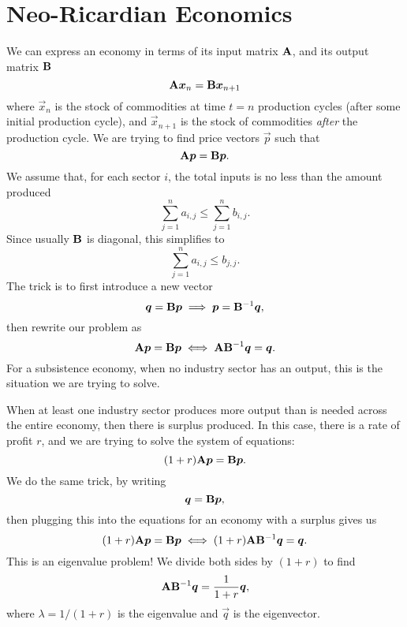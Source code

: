 \section{Neo-Ricardian Economics}

We can express an economy in terms of its input matrix $\mathbf{A}$, and
its output matrix $\mathbf{B}$
\begin{equation}
\mathbf{A}\boldsymbol{x}_{n} = \mathbf{B}\boldsymbol{x}_{n+1}
\end{equation}
where $\vec{x}_{n}$ is the stock of commodities at time $t=n$ production
cycles (after some initial production cycle), and $\vec{x}_{n+1}$ is the
stock of commodities \emph{after} the production cycle. We are trying to
find price vectors $\vec{p}$ such that
\begin{equation}
\mathbf{A}\boldsymbol{p} = \mathbf{B}\boldsymbol{p}.
\end{equation}
We assume that, for each sector $i$, the total inputs is no less than
the amount produced
\begin{equation}
\sum_{j=1}^{n}a_{i,j} \leq\sum_{j=1}^{n}b_{i,j}.
\end{equation}
Since usually $\mathbf{B}$ is diagonal, this simplifies to
\begin{equation*}
\sum_{j=1}^{n}a_{i,j} \leq b_{j,j}.
\end{equation*}
The trick is to first introduce a new vector
\begin{equation}
\boldsymbol{q} = \mathbf{B}\boldsymbol{p}\implies \boldsymbol{p}=\mathbf{B}^{-1}\boldsymbol{q},
\end{equation}
then rewrite our problem as
\begin{equation}
\mathbf{A}\boldsymbol{p} = \mathbf{B}\boldsymbol{p}\iff \mathbf{A}\mathbf{B}^{-1}\boldsymbol{q} = \boldsymbol{q}.
\end{equation}
For a subsistence economy, when no industry sector has an output, this
is the situation we are trying to solve.

When at least one industry sector produces more output than is needed
across the entire economy, then there is surplus produced. In this case,
there is a rate of profit $r$, and we are trying to solve the system of
equations:
\begin{equation}
(1+r)\mathbf{A}\boldsymbol{p} = \mathbf{B}\boldsymbol{p}.
\end{equation}
We do the same trick, by writing
\begin{equation}
\boldsymbol{q} = \mathbf{B}\boldsymbol{p},
\end{equation}
then plugging this into the equations for an economy with a surplus
gives us
\begin{equation}
(1+r)\mathbf{A}\boldsymbol{p} = \mathbf{B}\boldsymbol{p} \iff (1+r)\mathbf{A}\mathbf{B}^{-1}\boldsymbol{q}=\boldsymbol{q}.
\end{equation}
This is an eigenvalue problem! We divide both sides by $(1+r)$ to find
\begin{equation}
\mathbf{A}\mathbf{B}^{-1}\boldsymbol{q}=\frac{1}{1+r}\boldsymbol{q},
\end{equation}
where $\lambda=1/(1+r)$ is the eigenvalue and $\vec{q}$ is the
eigenvector.

